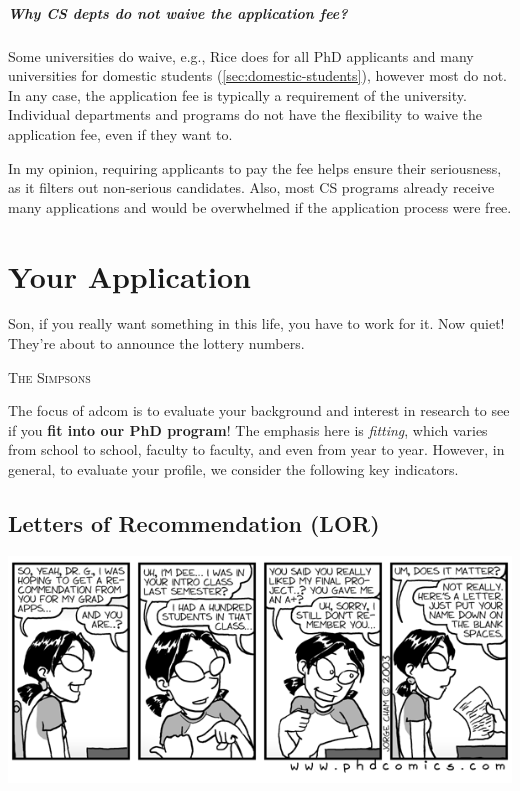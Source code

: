 \documentclass[oneside,11pt,dvipsnames]{book}
\newcommand{\mycomment}[3][\color{blue}]{{#1{{#2}: {#3}}}}
\newcommand{\didi}[1]{\mycomment{Didier}{#1}}{}
\begin{document}


\paragraph{Why CS depts do not waive the application fee?}  Some universities do waive, e.g., Rice does for all PhD applicants and many universities for domestic students (\autoref{sec:domestic-students}), however most do not.  In any case, the application fee is typically a requirement of the university. Individual departments and programs do not have the flexibility to waive the application fee, even if they want to.

In my opinion, requiring applicants to pay the fee helps ensure their seriousness, as it filters out non-serious candidates. Also, most CS programs already receive many applications and would be overwhelmed if the application process were free.  


\chapter{Your Application}\label{sec:application}

\epigraph{Son, if you really want something in this life, you have to work for it. Now quiet! They’re about to announce the lottery numbers.}{\textsc{The Simpsons}}


The focus of adcom is to evaluate your background and interest in research to see if you \textbf{fit into our PhD program}! The emphasis here is \emph{fitting}, which varies from school to school, faculty to faculty, and even from year to year.  However, in general, to evaluate your profile, we consider the following key indicators.


\section{Letters of Recommendation (LOR)}\label{sec:lor}

\begin{center}
  \includegraphics[width=0.6\linewidth]{files/c6.png}
\end{center}
\end{document}
